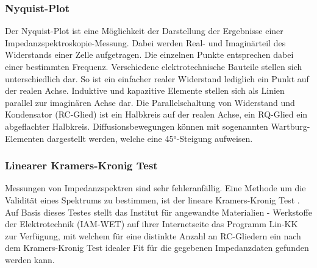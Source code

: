 \documentclass[a4paper, 11pt, headsepline,footsepline,twoside,abstract]{scrbook}
\begin{document}
\subsubsection{Nyquist-Plot}
Der Nyquist-Plot ist eine Möglichkeit der Darstellung der Ergebnisse einer Impedanz\-spek\-troskopie-Messung. Dabei werden Real- und Imaginärteil des Widerstands einer Zelle aufgetragen. Die einzelnen Punkte entsprechen dabei einer bestimmten Frequenz. Verschiedene elektrotechnische Bauteile stellen sich unterschiedlich dar. So ist ein einfacher realer Widerstand lediglich ein Punkt auf der realen Achse. Induktive und kapazitive Elemente stellen sich als Linien parallel zur imaginären Achse dar. Die Parallelschaltung von Widerstand und Kondensator (RC-Glied) ist ein Halbkreis auf der realen Achse, ein RQ-Glied ein abgeflachter Halbkreis. Diffusionsbewegungen können mit sogenannten Wartburg-Elementen dargestellt werden, welche eine \ang{45}-Steigung aufweisen.
\subsubsection{Linearer Kramers-Kronig Test}
Messungen von Impedanzspektren sind sehr fehleranfällig. Eine Methode um die Validität eines Spektrums zu bestimmen, ist der lineare Kramers-Kronig Test \cite{schonleber2014method}. Auf Basis dieses Testes stellt das Institut für angewandte Materialien - Werkstoffe der Elektrotechnik (IAM-WET) auf ihrer Internetseite das Programm Lin-KK zur Verfügung, mit welchem für eine distinkte Anzahl an RC-Gliedern ein nach dem Kramers-Kronig Test idealer Fit für die gegebenen Impedanzdaten gefunden werden kann. 
\end{document}
